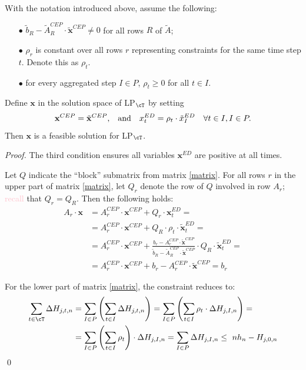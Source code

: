 \begin{proposition}\label{prop rho}
  With the notation introduced above, assume the following:
  \begin{itemize}
  \item[$\bullet$]  $\tilde{b}_R-\tilde{A}_R^{CEP}\cdot\tilde{\mathbf{x}}^{CEP}\neq0$ for all rows $R$ of $\tilde{A}$;
  \item[$\bullet$] $\rho_r$ is constant over %
  all rows $r$ representing constraints for the same time step $t$. Denote this as $\rho_t$.
  \item[$\bullet$] for every aggregated step $I\in P$,  $\rho_t\ge0$ for all $t\in I$. 
  \end{itemize}
  Define $\mathbf{x}$ in the solution space of LP$_{\cT}$ by setting 
  \[ \mathbf{x}^{CEP} = \tilde{\mathbf{x}}^{CEP}\text{,\quad and\quad} x^{ED}_t = \rho_t\cdot \tilde{x}^{ED}_I \quad \forall t\in I, I\in P.\]
  Then $\mathbf{x}$ is a feasible solution for LP$_{\cT}$.
\end{proposition}

\begin{proof}
  The third condition ensures all variables $\mathbf{x}^{ED}$ are positive at all times.

  Let $Q$ indicate the ``block'' submatrix from matrix \ref{matrix}. 
  For all rows $r$ in the upper part of matrix \ref{matrix}, let $Q_r$ denote the row of $Q$ involved in row $A_r$; \textcolor{pink}{recall} that $Q_r=Q_R$. Then the following holds:
\begin{align*}
A_r \cdot \mathbf{x} &=A^{CEP}_r\cdot \mathbf{x}^{CEP} +  Q_r\cdot \mathbf{x}^{ED}_t = \\
&=A^{CEP}_r\cdot \mathbf{x}^{CEP} +  Q_R\cdot \rho_t\cdot\tilde{\mathbf{x}}^{ED}_t = \\
&=A^{CEP}_r\cdot \mathbf{x}^{CEP} + \frac{b_r - A_r^{CEP} \cdot \tilde{\mathbf{x}}^{CEP}}{\tilde{b}_R - \tilde{A}_R^{CEP}\cdot \tilde{\mathbf{x}}^{CEP}} \cdot Q_R \cdot \tilde{\mathbf{x}}^{ED}_t =\\
&=A^{CEP}_r\cdot \mathbf{x}^{CEP} + b_r - A^{CEP}_r\cdot \tilde{\mathbf{x}}^{CEP} = b_r
\end{align*}

For the lower part of matrix \ref{matrix}, the constraint reduces to:
\begin{align*}
\sum_{t\in \cT} \Delta H_{j,t,n} &= \sum_{I\in P} \left( \sum_{t\in I} \Delta H_{j,t,n} \right) = \sum_{I\in P} \left( \sum_{t\in I} \rho_t\cdot\Delta H_{j,I,n} \right) = \\
& = \sum_{I\in P} \left( \sum_{t\in I} \rho_t \right)\cdot\Delta H_{j,I,n} =  \sum_{I\in P}\Delta H_{j,I,n} \le \ nh_n - H_{j,0,n}
\end{align*}
\qed\end{proof}

